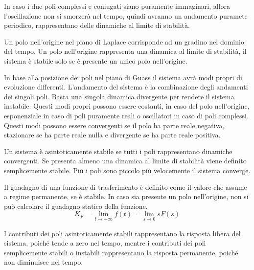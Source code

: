 \documentclass{article}
\numberwithin{equation}{subsection}
\begin{document}
In caso i due poli complessi e coniugati siano puramente immaginari, allora l'oscillazione non si smorzerà nel tempo, quindi avranno un andamento puramete periodico, 
rappresentano delle dinamiche al limite di stabilità.
\begin{center}
\end{center} 

Un polo nell'origine nel piano di Laplace corrisponde ad un gradino nel dominio del tempo. Un polo nell'origine rappresenta una dinamica al limite di stabilità, il 
sistema è stabile solo se è presente un unico polo nell'origine. 

In base alla posizione dei poli nel piano di Guass il sistema avrà modi propri di evoluzione differenti. L'andamento del sistema è la combinazione degli andamenti dei 
singoli poli. Basta una singola dinamica divergente per rendere il sistema instabile. Questi modi propri possono essere costanti, in caso del polo nell'origine, esponenziale 
in caso di poli puramente reali o oscillatori in caso di poli complessi. Questi modi possono essere convergenti se il polo ha parte reale negativa, stazionare se ha parte 
reale nulla e divergente se ha parte reale positiva. 

Un sistema è asintoticamente stabile se tutti i poli rappresentano dinamiche convergenti. Se presenta almeno una dinamica al limite di stabilità viene definito semplicemente 
stabile. Più i poli sono piccolo più velocemente il sistema converge. 

Il guadagno di una funzione di trasferimento è definito come il valore che assume a regime permanente, se è stabile. In caso sia presente un polo nell'origine, non si può 
calcolare il guadagno statico della funzione.
\begin{equation}
    K_F=\lim_{t\to+\infty}f(t)=\lim_{s\to0}sF(s)
\end{equation}

I contributi dei poli asintoticamente stabili rappresentano la risposta libera del sistema, poiché tende a zero nel tempo, mentre i contributi dei poli semplicemente stabili 
o instabili rappresentano la risposta permanente, poiché non diminuisce nel tempo.
\end{document}
